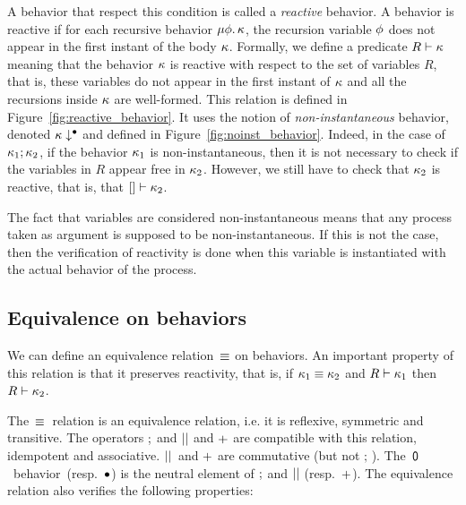 \documentclass[9pt,preprint]{sigplanconf}
\begin{document}
A behavior that respect this condition is called a \emph{reactive} behavior. A behavior is reactive if for each recursive behavior $\mu \phi.\, \kappa$, the recursion variable $\phi$ does not appear in the first instant of the body $\kappa$. Formally, we define a predicate $R \vdash \kappa$ meaning that the behavior $\kappa$ is reactive with respect to the set of variables $R$, that is, these variables do not appear in the first instant of $\kappa$ and all the recursions inside $\kappa$ are well-formed. This relation is defined in Figure~\ref{fig:reactive_behavior}. It uses the notion of \emph{non-instantaneous} behavior, denoted $\kappa\downarrow^{\bullet}$ and defined in Figure~\ref{fig:noinst_behavior}. Indeed, in the case of $\kappa_1 ; \kappa_2$, if the behavior $\kappa_1$ is non-instantaneous, then it is not necessary to check if the variables in $R$ appear free in $\kappa_2$. However, we still have to check that $\kappa_2$ is reactive, that is, that $[] \vdash \kappa_2$.

The fact that variables are considered non-instantaneous means that any process taken as argument is supposed to be non-instantaneous. If this is not the case, then the verification of reactivity is done when this variable is instantiated with the actual behavior of the process.

\subsection{Equivalence on behaviors}
\label{sec:equiv_behaviors}

We can define an equivalence relation~$\equiv$ on behaviors. An important property of this relation is that it preserves reactivity, that is, if $\kappa_1 \equiv \kappa_2$ and $R \vdash \kappa_1$ then $R \vdash \kappa_2$.

The~$\equiv$~relation is an equivalence relation, i.e. it is reflexive, symmetric and transitive. The operators $;$ and $ \mid\mid $ and $+$ are compatible with this relation, idempotent and associative. $ \mid\mid $~and $+$ are commutative (but not $;\,$). The~$\textsf{0}$~behavior~(resp.~$\bullet$) is the neutral element of $;$ and $ \mid\mid $ (resp.~$+$). The equivalence relation also verifies the following properties:
%
\end{document}
